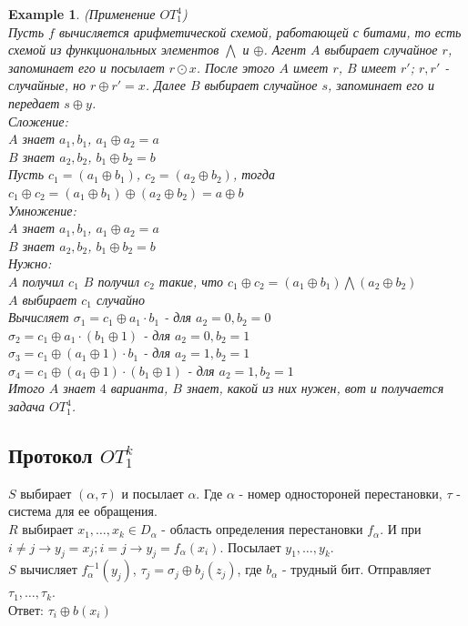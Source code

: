 \documentclass[a4paper]{article}
\theoremstyle{definition}
\theoremstyle{plain}
\newtheorem{example}{Example}
\begin{document}
\begin{example} (Применение $OT_1^4$)~\\
	Пусть $f$ вычисляется арифметической схемой, работающей с битами, то есть
	схемой из функциональных элементов $\bigwedge$ и $\oplus$. Агент $A$ выбирает
	случайное $r$, запоминает его и посылает $r \odot x$.
	После этого $A$ имеет $r$, $B$ имеет $r'$; $r, r'$ - случайные, но $r \oplus r' = x$.
	Далее $B$ выбирает случайное $s$, запоминает его и передает $s \oplus y$.~\\
	
	\noindent Сложение:~\\
		$A$ знает $a_1, b_1$, $a_1 \oplus a_2 = a$~\\
		$B$ знает $a_2, b_2$, $b_1 \oplus b_2 = b$~\\
		Пусть $c_1 = (a_1 \oplus b_1)$, $c_2 = (a_2 \oplus b_2)$, тогда
		$c_1 \oplus c_2 = (a_1 \oplus b_1) \oplus (a_2 \oplus b_2) = a \oplus b$~\\
		
	\noindent Умножение:~\\
		$A$ знает $a_1, b_1$, $a_1 \oplus a_2 = a$~\\
		$B$ знает $a_2, b_2$, $b_1 \oplus b_2 = b$~\\
		Нужно:~\\
			$A$ получил $c_1$
			$B$ получил $c_2$ такие, что $c_1 \oplus c_2 = (a_1 \oplus b_1) \bigwedge (a_2 \oplus b_2)$~\\
			
		\noindent $A$ выбирает $c_1$ случайно~\\
		Вычисляет $\sigma_1 = c_1 \oplus a_1 \cdot b_1$ - для $a_2 = 0, b_2 = 0$~\\
		$\sigma_2 = c_1 \oplus a_1 \cdot (b_1 \oplus 1)$ - для $a_2 = 0, b_2 = 1$ ~\\
		$\sigma_3 = c_1 \oplus (a_1 \oplus 1) \cdot b_1$ - для $a_2 = 1, b_2 = 1$ ~\\
		$\sigma_4 = c_1 \oplus (a_1 \oplus 1) \cdot (b_1 \oplus 1)$ - для $a_2 = 1, b_2 = 1$ ~\\
		Итого $A$ знает $4$ варианта, $B$ знает, какой из них нужен, вот и получается задача $OT_1^4$.
\end{example}

\subsection{Протокол $OT_1^k$}

$S$ выбирает $(\alpha, \tau)$ и посылает $\alpha$. Где $\alpha$ - номер одностороней
перестановки, $\tau$ - система для ее обращения.~\\
$R$ выбирает $x_1, \ldots, x_k \in D_{\alpha}$ - область определения перестановки $f_{\alpha}$.
И при $i \ne j \rightarrow y_j = x_j; i = j \rightarrow y_j = f_{\alpha}(x_i)$.
Посылает $y_1, \ldots, y_k$.~\\
$S$ вычисляет $f_{\alpha}^{-1}(y_j)$, $\tau_j = \sigma_j \oplus b_j(z_j)$, где
$b_{\alpha}$ - трудный бит.
Отправляет $\tau_1, \ldots, \tau_k$.~\\
Ответ: $\tau_i \oplus b(x_i)$
\end{document}
